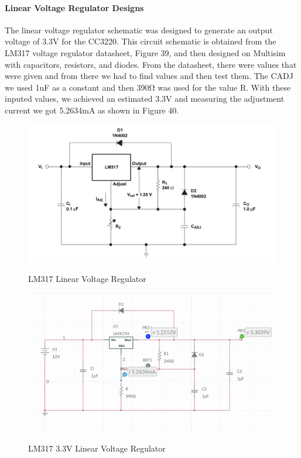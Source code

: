 \paragraph{Linear Voltage Regulator Designs}
The linear voltage regulator schematic was designed to generate an output voltage of 3.3V for the CC3220. This circuit schematic is obtained from the LM317 voltage regulator datasheet, Figure 39, and then designed on Multisim with capacitors, resistors, and diodes. From the datasheet, there were values that were given and from there we had to find values and then test them. The CADJ we used 1uF as a constant and then 390Ω was used for the value R. With these inputed values, we achieved an estimated 3.3V and measuring the adjustment current we got 5.2634mA as shown in Figure 40.\par
\begin{figure}[H]
    \centering
    \caption{LM317 Linear Voltage Regulator }
    \includegraphics[width=\textwidth]{images/LM317_Application_schematic.png}
    \label{fig:linear-voltage-regulator}
\end{figure}
\begin{figure}[H]
    \centering
    \caption{LM317 3.3V Linear Voltage Regulator}
    \includegraphics[width=\textwidth]{images/LM317_3.3_schematic.png}
    \label{fig:3.3V-linear-voltage-regulator}
\end{figure}

